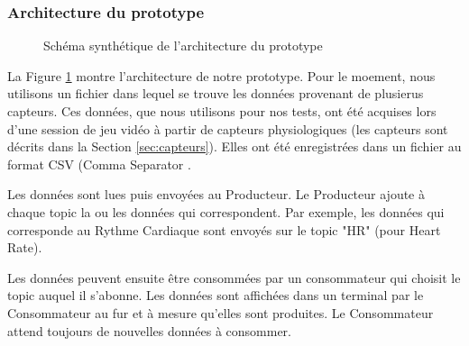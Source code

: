 \documentclass{article}
\begin{document}
		\subsubsection{Architecture du prototype}\label{sec:protoarchi}
			\begin{figure}
				\centering
				\caption{Schéma synthétique de l'architecture du prototype}
				\label{fig:archiproto}
			\end{figure}
			La Figure \ref{fig:archiproto} montre l'architecture de notre prototype.
			Pour le moement, nous utilisons un fichier dans lequel se trouve les données provenant de plusierus capteurs.
			Ces données, que nous utilisons pour nos tests, ont été acquises lors d'une session de jeu vidéo à partir de capteurs physiologiques (les capteurs sont décrits dans la Section \ref{sec:capteurs}). 
			Elles ont été enregistrées dans un fichier au format CSV (Comma Separator .\par
			Les données sont lues puis envoyées au Producteur.
			Le Producteur ajoute à chaque topic la ou les données qui correspondent.
			Par exemple, les données qui corresponde au Rythme Cardiaque sont envoyés sur le topic "HR" (pour Heart Rate).\par
			Les données peuvent ensuite être consommées par un consommateur qui choisit le topic auquel il s'abonne.
			Les données sont affichées dans un terminal par le Consommateur au fur et à mesure qu'elles sont produites.
			Le Consommateur attend toujours de nouvelles données à consommer.
\end{document}
